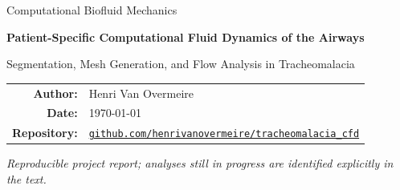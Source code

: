 \documentclass[11pt,a4paper]{article}
\newcommand{\reporttitle}{Patient-Specific Computational Fluid Dynamics of the Airways}
\newcommand{\reportsubtitle}{Segmentation, Mesh Generation, and Flow Analysis in Tracheomalacia}
\newcommand{\reportauthor}{Henri Van Overmeire}
\newcommand{\reportdate}{\today}
\begin{document}
\hypersetup{pageanchor=false}

\begin{titlepage}
  \centering
  \vspace*{2.5cm}

  {\Large Computational Biofluid Mechanics\par}
  \vspace{1.5cm}

  {\Huge\bfseries \reporttitle\par}
  \vspace{0.6cm}
  {\Large \reportsubtitle\par}

  \vfill

  \begin{tabular}{rl}
    \textbf{Author:} & \reportauthor \\
    \textbf{Date:}   & \reportdate \\
    \textbf{Repository:} &
    \href{https://github.com/henrivanovermeire/tracheomalacia_cfd/settings}
    {\texttt{github.com/henrivanovermeire/tracheomalacia\_cfd}}
  \end{tabular}

  \vfill

  \textit{Reproducible project report; analyses still in progress are identified
  explicitly in the text.}
\end{titlepage}

\hypersetup{pageanchor=true}
\end{document}

